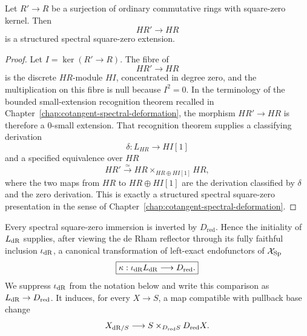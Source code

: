 \begin{lemma}
\label{lem:infinitesimal-discrete-square-zero-recognition}
Let $R'\to R$ be a surjection of ordinary commutative rings with square-zero
kernel.  Then
\[
    HR'\longrightarrow HR
\]
is a structured spectral square-zero extension.
\end{lemma}

\begin{proof}
Let $I=\ker(R'\to R)$.  The fibre of
\[
    HR'\longrightarrow HR
\]
is the discrete $HR$-module $HI$, concentrated in degree zero, and the
multiplication on this fibre is null because $I^2=0$.  In the terminology of
the bounded small-extension recognition theorem recalled in
Chapter~\ref{chap:cotangent-spectral-deformation}, the morphism
$HR'\to HR$ is therefore a $0$-small extension.  That recognition theorem
supplies a classifying derivation
\[
    \delta:L_{HR}\longrightarrow HI[1]
\]
and a specified equivalence over $HR$
\[
    HR'
    \xrightarrow{\simeq}
    HR\times_{HR\oplus HI[1]}HR,
\]
where the two maps from $HR$ to $HR\oplus HI[1]$ are the derivation
classified by $\delta$ and the zero derivation.  This is exactly a structured
spectral square-zero presentation in the sense of
Chapter~\ref{chap:cotangent-spectral-deformation}.
\end{proof}

\begin{theorem}
\label{thm:infinitesimal-reduced-comparison}
Every spectral square-zero immersion is inverted by $D_{\mathrm{red}}$.
Hence the initiality of $L_{\mathrm{dR}}$ supplies, after viewing the de Rham reflector
through its fully faithful inclusion $\iota_{\mathrm{dR}}$, a canonical transformation
of left-exact endofunctors of $\mathcal X_{\mathrm{Sp}}$
\[
    \boxed{
    \kappa:\iota_{\mathrm{dR}}L_{\mathrm{dR}}\longrightarrow D_{\mathrm{red}}.
    }
\]
We suppress $\iota_{\mathrm{dR}}$ from the notation below and write this comparison
as $L_{\mathrm{dR}}\to D_{\mathrm{red}}$.  It induces, for every $X\to S$, a map
compatible with pullback base change
\[
    X_{\mathrm{dR}/S}
    \longrightarrow
    S\times_{D_{\mathrm{red}}S}D_{\mathrm{red}}X.
\]
\end{theorem}

